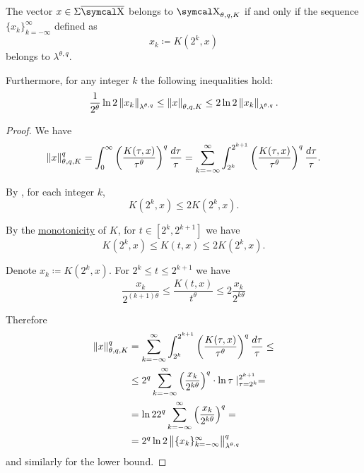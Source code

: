 \begin{theorem}\label{thm:discrete_k_interpolation}
  The vector \( x \in \Sigma\Ol{\CX} \) belongs to \hyperref[def:k_functional_interpolation_space]{\( \CX_{\theta,q,K} \)} if and only if the sequence \( \{ x_k \}_{k=-\infty}^\infty \) defined as
  \begin{equation}\label{eq:thm:discrete_k_interpolation/sequence}
    x_k \coloneqq K(2^k, x)
  \end{equation}
  belongs to \hyperref[def:discrete_k_interpolation_space]{\( \lambda^{\theta,q} \)}.

  Furthermore, for any integer \( k \) the following inequalities hold:
  \begin{equation}\label{eq:thm:discrete_k_interpolation/inequalities}
    \frac 1 {2^\theta} \ln 2 \left\Vert x_k \right\Vert_{\lambda^{\theta,q}}
    \leq
    \left\Vert x \right\Vert_{\theta,q,K}
    \leq
    2 \ln 2 \left\Vert x_k \right\Vert_{\lambda^{\theta,q}}.
  \end{equation}
\end{theorem}
\begin{proof}
  We have
  \begin{equation*}
    \left\Vert x \right\Vert_{\theta,q,K}^q
    =
    \int_0^\infty \left( \frac {K(\tau, x)} {\tau^\theta} \right)^q \frac {d\tau} \tau
    =
    \sum_{k=-\infty}^\infty \int_{2^k}^{2^{k+1}} \left( \frac {K(\tau, x)} {\tau^\theta} \right)^q \frac {d\tau} \tau.
  \end{equation*}

  By , for each integer \( k \),
  \begin{equation*}
    K(2^k, x) \leq 2 K(2^k, x).
  \end{equation*}

  By the \hyperref[def:k_functional_properties/basic]{monotonicity} of \( K \), for \( t \in [2^k, 2^{k+1}] \) we have
  \begin{equation*}
    K(2^k, x) \leq K(t, x) \leq 2 K(2^k, x).
  \end{equation*}

  Denote \( x_k \coloneqq K(2^k, x) \). For \( 2^k \leq t \leq 2^{k+1} \) we have
  \begin{equation*}
    \frac{x_k}{2^{(k+1)\theta}} \leq \frac{K(t, x)}{t^\theta} \leq 2 \frac{x_k}{2^{k\theta}}
  \end{equation*}

  Therefore
  \begin{align*}
    \left\Vert x \right\Vert_{\theta,q,K}^q
    &=
    \sum_{k=-\infty}^\infty \int_{2^k}^{2^{k+1}} \left( \frac {K(\tau, x)} {\tau^\theta} \right)^q \frac {d\tau} \tau
    \leq \\ &\leq
    2^q \sum_{k=-\infty}^\infty \left(\frac{x_k}{2^{k\theta}} \right)^q \cdot \ln \tau \mid_{\tau=2^k}^{2^{k+1}}
    = \\ &=
    \ln 2 2^q \sum_{k=-\infty}^\infty \left(\frac{x_k}{2^{k\theta}} \right)^q
    = \\ &=
    2^q \ln 2 \left\Vert \{ x_k \}_{k=-\infty}^\infty \right\Vert_{\lambda^{\theta,q}}^q
  \end{align*}
  and similarly for the lower bound.
\end{proof}
